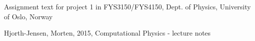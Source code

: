 \documentclass[a4paper,english]{article}
\begin{document}
\begin{thebibliography}{}
    Assignment text for project 1 in FYS3150/FYS4150,
    Dept. of Physics, University of Oslo, Norway

    Hjorth-Jensen, Morten,
    2015,
    Computational Physics - lecture notes
\end{thebibliography}
\end{document}
